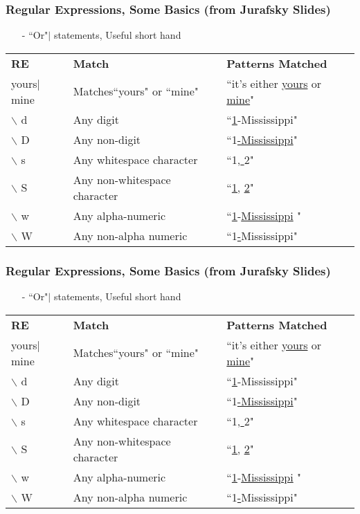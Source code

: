  \begin{frame}[fragile]
\frametitle{Regular Expressions, Some Basics (from Jurafsky Slides) } 

\begin{itemize}
\item[-] ``Or"$|$ statements, Useful short hand 
\end{itemize}
\begin{center}
\begin{tabular}{lll}
\textbf{RE} & \textbf{Match} & \textbf{Patterns Matched}\\
yours$|$mine & Matches``yours" or ``mine" & ``it's either \underline{yours} or \underline{mine}"\\
$\backslash$ d  & Any digit  & ``\underline{1}-Mississippi" \\
$\backslash$ D  & Any non-digit & ``1\underline{-Mississippi}" \\
$\backslash$ s & Any whitespace character & ``1,\underline{ }2"\\
$\backslash$ S & Any non-whitespace character & ``\underline{1,} \underline{2}" \\
$\backslash$ w & Any alpha-numeric  &  ``\underline{1}-\underline{Mississippi} " \\
$\backslash$ W & Any non-alpha numeric & ``1\underline{-}Mississippi"  \\
\end{tabular}
\end{center}
\end{frame}

 \begin{frame}[fragile]
\frametitle{Regular Expressions, Some Basics (from Jurafsky Slides) } 

\begin{itemize}
\item[-] ``Or"$|$ statements, Useful short hand 
\end{itemize}
\begin{center}
\begin{tabular}{lll}
\textbf{RE} & \textbf{Match} & \textbf{Patterns Matched}\\
yours$|$mine & Matches``yours" or ``mine" & ``it's either \underline{yours} or \underline{mine}"\\
$\backslash$ d  & Any digit  & ``\underline{1}-Mississippi" \\
$\backslash$ D  & Any non-digit & ``1\underline{-Mississippi}" \\
$\backslash$ s & Any whitespace character & ``1,\underline{ }2"\\
$\backslash$ S & Any non-whitespace character & ``\underline{1,} \underline{2}" \\
$\backslash$ w & Any alpha-numeric  &  ``\underline{1}-\underline{Mississippi} " \\
$\backslash$ W & Any non-alpha numeric & ``1\underline{-}Mississippi"  \\
\end{tabular}
\end{center}
\end{frame}


